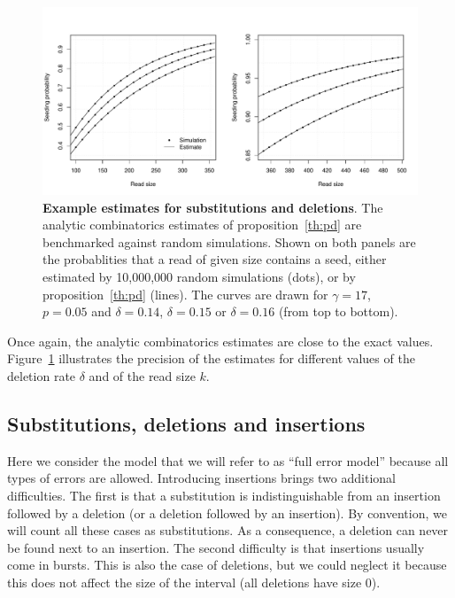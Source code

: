 \documentclass{article}
\begin{document}
\begin{figure}[h]
\centering
\includegraphics[scale=0.445]{simulpdel.pdf}
\caption{\textbf{Example estimates for substitutions and deletions}. The
analytic combinatorics estimates of proposition~\ref{th:pd} are
benchmarked against random simulations. Shown on both panels are the
probablities that a read of given size contains a seed, either estimated
by 10,000,000 random simulations (dots), or by proposition~\ref{th:pd}
(lines). The curves are drawn for $\gamma=17$, $p=0.05$ and $\delta=0.14$,
$\delta=0.15$ or $\delta=0.16$ (from top to bottom).}
\label{fig:simulpdel}
\end{figure}

Once again, the analytic combinatorics estimates are close to the exact
values. Figure~\ref{fig:simulpdel} illustrates the precision of the
estimates for different values of the deletion rate $\delta$ and of the
read size $k$.






\subsection{Substitutions, deletions and insertions}
\label{sec:insertions}

Here we consider the model that we will refer to as ``full error model''
because all types of errors are allowed. Introducing insertions brings two
additional difficulties. The first is that a substitution is
indistinguishable from an insertion followed by a deletion (or a deletion
followed by an insertion). By convention, we will count all these cases as
substitutions. As a consequence, a deletion can never be found next to an
insertion. The second difficulty is that insertions usually come in
bursts. This is also the case of deletions, but we could neglect it
because this does not affect the size of the interval (all deletions have
size $0$). 
\end{document}
